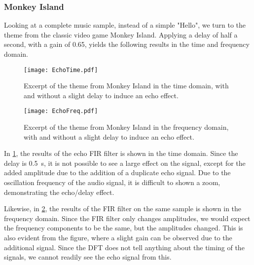 \subsubsection{Monkey Island}
Looking at a complete music sample, instead of a simple "Hello", we turn to the theme from the classic video game Monkey Island. Applying a delay of half a second, with a gain of \num{0.65}, yields the following results in the time and frequency domain.

\begin{figure}[!hbt]
	\centering
	\texttt{[image: EchoTime.pdf]}
	\caption{Excerpt of the theme from Monkey Island in the time domain, with and without a slight delay to induce an echo effect.}
	\label{fig:echotime}
\end{figure}

\begin{figure}[!hbt]
	\centering
	\texttt{[image: EchoFreq.pdf]}
	\caption{Excerpt of the theme from Monkey Island in the frequency domain, with and without a slight delay to induce an echo effect.}
	\label{fig:echofreq}
\end{figure}

In \cref{fig:echotime}, the results of the echo FIR filter is shown in the time domain. Since the delay is \SI{0.5}{\second}, it is not possible to see a large effect on the signal, except for the added amplitude due to the addition of a duplicate echo signal. Due to the oscillation frequency of the audio signal, it is difficult to shown a zoom, demonstrating the echo/delay effect.

Likewise, in \cref{fig:echofreq}, the results of the FIR filter on the same sample is shown in the frequency domain. Since the FIR filter only changes amplitudes, we would expect the frequency components to be the same, but the amplitudes changed. This is also evident from the figure, where a slight gain can be observed due to the additional signal. Since the DFT does not tell anything about the timing of the signals, we cannot readily see the echo signal from this.
